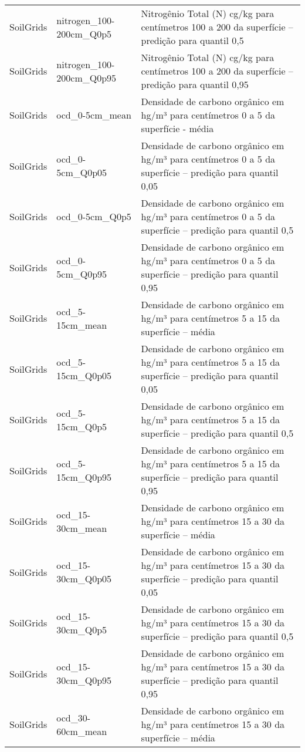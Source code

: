 \begin{longtable}{@{} p{4cm} p{4cm} p{8cm} @{}}
	SoilGrids &
	nitrogen\_100-200cm\_Q0p5 &
	Nitrogênio Total (N) cg/kg  para centímetros 100 a 200 da superfície – predição para quantil 0,5 \\
	SoilGrids &
	nitrogen\_100-200cm\_Q0p95 &
	Nitrogênio Total (N) cg/kg  para centímetros 100 a 200 da superfície – predição para quantil 0,95 \\
	SoilGrids &
	ocd\_0-5cm\_mean &
	Densidade de carbono orgânico em hg/m³ para centímetros 0 a 5 da superfície - média \\
	SoilGrids &
	ocd\_0-5cm\_Q0p05 &
	Densidade de carbono orgânico em hg/m³ para centímetros 0 a 5 da superfície – predição para quantil 0,05 \\
	SoilGrids &
	ocd\_0-5cm\_Q0p5 &
	Densidade de carbono orgânico em hg/m³ para centímetros 0 a 5 da superfície – predição para quantil 0,5 \\
	SoilGrids &
	ocd\_0-5cm\_Q0p95 &
	Densidade de carbono orgânico em hg/m³ para centímetros 0 a 5 da superfície – predição para quantil 0,95 \\
	SoilGrids &
	ocd\_5-15cm\_mean &
	Densidade de carbono orgânico em hg/m³ para centímetros 5 a 15 da superfície – média \\
	SoilGrids &
	ocd\_5-15cm\_Q0p05 &
	Densidade de carbono orgânico em hg/m³ para centímetros 5 a 15 da superfície – predição para quantil 0,05 \\
	SoilGrids &
	ocd\_5-15cm\_Q0p5 &
	Densidade de carbono orgânico em hg/m³ para centímetros 5 a 15 da superfície – predição para quantil 0,5 \\
	SoilGrids &
	ocd\_5-15cm\_Q0p95 &
	Densidade de carbono orgânico em hg/m³ para centímetros 5 a 15 da superfície – predição para quantil 0,95 \\
	SoilGrids &
	ocd\_15-30cm\_mean &
	Densidade de carbono orgânico em hg/m³ para centímetros 15 a 30 da superfície – média \\
	SoilGrids &
	ocd\_15-30cm\_Q0p05 &
	Densidade de carbono orgânico em hg/m³ para centímetros 15 a 30 da superfície – predição para quantil 0,05 \\
	SoilGrids &
	ocd\_15-30cm\_Q0p5 &
	Densidade de carbono orgânico em hg/m³ para centímetros 15 a 30 da superfície – predição para quantil 0,5 \\
	SoilGrids &
	ocd\_15-30cm\_Q0p95 &
	Densidade de carbono orgânico em hg/m³ para centímetros 15 a 30 da superfície – predição para quantil 0,95 \\
	SoilGrids &
	ocd\_30-60cm\_mean &
	Densidade de carbono orgânico em hg/m³ para centímetros 15 a 30 da superfície – média \\

\end{longtable}
